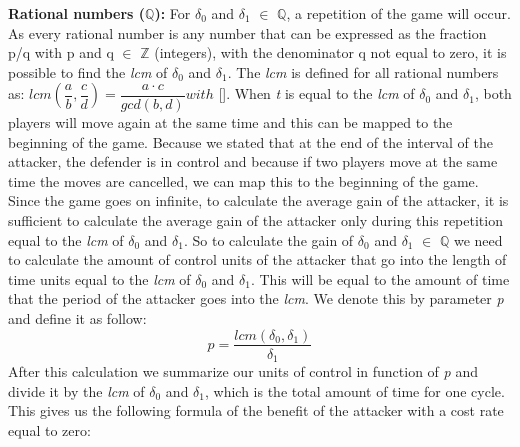 \textbf{Rational numbers (\(\mathbb{Q}\)):} For $\delta_{0}$ and $\delta_{1}$ $\in$ \(\mathbb{Q}\), a repetition of the game will occur. As every rational number is any number that can be expressed as the fraction p/q with p and q $\in$ \(\mathbb{Z}\) (integers), with the denominator q not equal to zero, it is possible to find the \textit{lcm} of $\delta_{0}$ and $\delta_{1}$. The \textit{lcm} is defined for all rational numbers as: $lcm(\dfrac{a}{b},\dfrac{c}{d})= \dfrac{a \cdot c}{gcd(b,d)} with  $ []. When \textit{t} is equal to the \textit{lcm} of $\delta_{0}$ and $\delta_{1}$, both players will move again at the same time and this can be mapped to the beginning of the game. Because we stated that at the end of the interval of the attacker, the defender is in control and because if two players move at the same time the moves are cancelled, we can map this to the beginning of the game. Since the game goes on infinite, to calculate the average gain of the attacker, it is sufficient to calculate the average gain of the attacker only during this repetition equal to the \textit{lcm} of $\delta_{0}$ and $\delta_{1}$. 
So to calculate the gain of $\delta_{0}$ and $\delta_{1}$ $\in$ \(\mathbb{Q}\) we need to calculate the amount of control units of the attacker that go into the length of time units equal to the \textit{lcm} of  $\delta_{0}$ and $\delta_{1}$. This will be equal to the amount of time that the period of the attacker goes into the \textit{lcm}. We denote this by parameter \textit{p} and define it as follow:
\begin{equation}\label{first}
p = \dfrac{lcm(\delta_{0},\delta_{1})}{\delta_{1} } 
\end{equation}
After this calculation we summarize our units of control in function of \textit{p} and divide it by the \textit{lcm} of $\delta_{0} $ and $ \delta_{1}$, which is the total amount of time for one cycle.  This gives us the following formula of the benefit of the attacker with a cost rate equal to zero:


